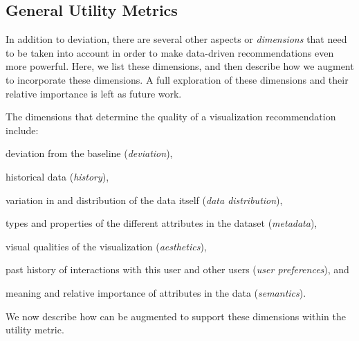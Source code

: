 {%




\subsection{General Utility Metrics}\label{sec:gen_util}


In addition to deviation, there are several other aspects
or {\em dimensions} that need to be taken into account
in order to make data-driven recommendations even more powerful.
Here, we list these dimensions, and then describe how 
we augment \SeeDB to incorporate these dimensions.
A full exploration of these dimensions
and their relative importance is left as future work.
  
The dimensions that determine the quality of a visualization recommendation
include:
  \begin{inparaenum}
  \item deviation from the baseline ({\it deviation}),
  \item historical data ({\em history}),
  \item variation in and distribution of the data itself ({\it data distribution}),
  \item types and properties of the different attributes in the dataset ({\it metadata}), 
\item visual qualities of the visualization ({\it aesthetics}),  
\item past history of interactions with this user and other users ({\it user preferences}), and 
\item meaning and relative importance of attributes in the data ({\it semantics}). 
\end{inparaenum}
We now describe how \SeeDB can be augmented to support these dimensions
within the utility metric.

}
